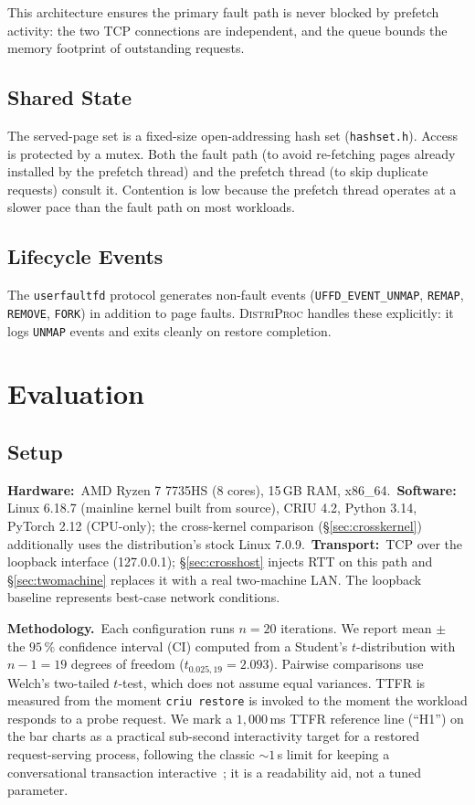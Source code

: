 \documentclass[journal]{IEEEtran}
\newcommand{\distriproc}{\textsc{DistriProc}\xspace}
\newcommand{\uffd}{\texttt{userfaultfd}\xspace}
\begin{document}
This architecture ensures the primary fault path is never blocked by
prefetch activity: the two TCP connections are independent, and the queue
bounds the memory footprint of outstanding requests.

\subsection{Shared State}
\label{sec:sharedstate}

The served-page set is a fixed-size open-addressing hash set
(\texttt{hashset.h}). Access is protected by a mutex. Both the fault path
(to avoid re-fetching pages already installed by the prefetch thread) and
the prefetch thread (to skip duplicate requests) consult it. Contention is
low because the prefetch thread operates at a slower pace than the fault
path on most workloads.

\subsection{Lifecycle Events}

The \uffd protocol generates non-fault events (\texttt{UFFD\_EVENT\_UNMAP},
\texttt{REMAP}, \texttt{REMOVE}, \texttt{FORK}) in addition to page faults.
\distriproc handles these explicitly: it logs \texttt{UNMAP} events and
exits cleanly on restore completion.

\section{Evaluation}
\label{sec:eval}

\subsection{Setup}

\textbf{Hardware:}\, AMD Ryzen 7 7735HS (8 cores), 15\,GB RAM,
x86\_64.\, \textbf{Software:}\, Linux 6.18.7 (mainline kernel built from
source), CRIU 4.2, Python 3.14, PyTorch 2.12 (CPU-only); the cross-kernel
comparison (\S\ref{sec:crosskernel}) additionally uses the distribution's
stock Linux 7.0.9.\, \textbf{Transport:}\, TCP over the loopback interface
(127.0.0.1); \S\ref{sec:crosshost} injects RTT on this path and
\S\ref{sec:twomachine} replaces it with a real two-machine LAN. The loopback
baseline represents best-case network conditions.

\textbf{Methodology.}\, Each configuration runs $n\!=\!20$ iterations. We
report mean $\pm$ the $95\,\%$ confidence interval (CI) computed
from a Student's $t$-distribution with $n{-}1\!=\!19$ degrees of freedom
($t_{0.025,19}\!=\!2.093$). Pairwise comparisons use Welch's two-tailed
$t$-test, which does not assume equal variances. TTFR is measured from the
moment \texttt{criu restore} is invoked to the moment the workload responds
to a probe request. We mark a $1{,}000$\,ms TTFR reference line (``H1'') on the
bar charts as a practical sub-second interactivity target for a restored
request-serving process, following the classic ${\sim}1$\,s limit for
keeping a conversational transaction interactive~\cite{miller1968response};
it is a readability aid, not a tuned parameter.
\end{document}
